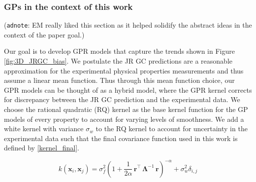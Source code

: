 \documentclass[journal=jacsat,manuscript=article, ]{achemso}
\newcommand{\xvec}{\ensuremath{\mathbf{x}}}
\newcommand{\adnote}[1]{{\color{OliveGreen} (\texttt{adnote}: #1)}}
\begin{document}
\subsubsection{GPs in the context of this work}

\adnote{EM really liked this section as it helped solidify the abstract ideas in the context of the paper goal.}


Our goal is to develop GPR models that capture the trends shown in Figure \ref{fig:3D_JRGC_bias}. We postulate the JR GC predictions are a reasonable approximation for the experimental physical properties measurements and thus assume a linear mean function. Thus through this mean function choice, our GPR models can be thought of as a hybrid model,\cite{eugene2023learning} where the GPR kernel corrects for discrepancy between the JR GC prediction and the experimental data. We choose the rational quadratic (RQ) kernel as the base kernel function for the GP models of every property to account for varying levels of smoothness. We add a white kernel with variance $\sigma_w$ to the RQ kernel to account for uncertainty in the experimental data such that the final covariance function used in this work is defined by \eqref{kernel_final}. 

 \begin{equation}
     k(\xvec_i,\xvec_j) = \sigma_f^2 \left(1 +\frac{1}{2 \alpha} \,\mathbf{r}^\intercal \,\boldsymbol{\Lambda}^{-1} \,\mathbf{r} \right)^{-\alpha} + \sigma_w^2\delta_{i,j} 
     \label{kernel_final}
 \end{equation}
\end{document}
